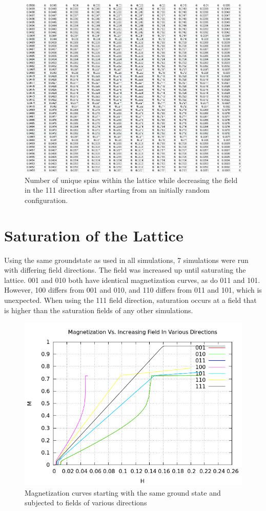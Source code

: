 \documentclass{article}
\begin{document}
\begin{figure}[ht]
\centering
 \includegraphics[keepaspectratio,scale=0.7]{111_3000/005to000RSpinChart.png}
\caption{Number of unique spins within the lattice while decreasing the field in the 111 direction after starting
from an initially random configuration.} 
\end{figure}
\clearpage

\section{Saturation of the Lattice}
Using the same groundstate as used in all simulations, 7 simulations were run with differing field directions. The 
field was increased up until saturating the lattice. 001 and 010 both have identical magnetization curves, as do
011 and 101. However, 100 differs from 001 and 010, and 110 differs from 011 and 101, which is unexpected. When using
the 111 field direction, saturation occurs at a field that is higher than the saturation fields of any other simulations. 
\begin{figure}[ht]
 \centering
 \includegraphics[scale=0.6]{HVariedData/Increasing/IncreasingField.png}
 \caption{Magnetization curves starting with the same ground state and subjected to fields of various directions}
\end{figure}
\clearpage
\end{document}

